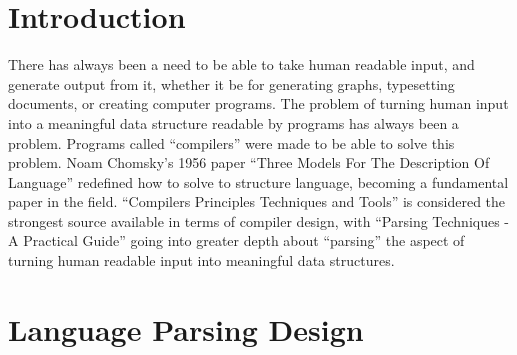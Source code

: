 \section{Introduction}
There has always been a need to be able to take human readable input, and generate output from it, whether it be for generating graphs, typesetting documents, or creating computer programs. The problem of turning human input into a meaningful data structure readable by programs has always been a problem. Programs called ``compilers'' were made to be able to solve this problem. Noam Chomsky's 1956 paper ``Three Models For The Description Of Language'' redefined how to solve to structure language, becoming a fundamental paper in the field. ``Compilers Principles Techniques and Tools'' is considered the strongest source available in terms of compiler design, with ``Parsing Techniques - A Practical Guide'' going into greater depth about ``parsing'' the aspect of turning human readable input into meaningful data structures.

\newpage
\section{Language Parsing Design}

